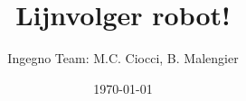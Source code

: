 \documentclass[11pt,a4paper]{article}
\begin{document}
 \title{Lijnvolger robot!}
 \author{Ingegno Team: M.C. Ciocci, B. Malengier}
 \date{\today}
 \maketitle

\begin{Parallel}{7.5cm}{7.5cm}



\end{Parallel}
\end{document}
